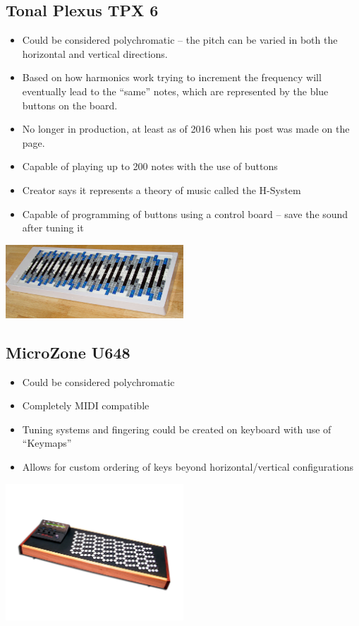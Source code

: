 \documentclass{article}
\begin{document}
\subsection*{Tonal Plexus TPX 6}

\begin{itemize}
	\item Could be considered polychromatic – the pitch can be varied in both the horizontal and vertical directions.
	\item Based on how harmonics work trying to increment the frequency will eventually lead to the “same” notes, which are represented by the blue buttons on the board.
	\item No longer in production, at least as of 2016 when his post was made on the page.
	\item Capable of playing up to 200 notes with the use of buttons
	\item Creator says it represents a theory of music called the H-System
	\item Capable of programming of buttons using a control board – save the sound after tuning it
\end{itemize}

\begin{center}
\includegraphics[width=0.5\textwidth]{mt3.jpg}
\end{center}

\subsection*{MicroZone U648}

\begin{itemize}
	\item Could be considered polychromatic
	\item Completely MIDI compatible
	\item Tuning systems and fingering could be created on keyboard with use of “Keymaps”
	\item Allows for custom ordering of keys beyond horizontal/vertical configurations
\end{itemize}

\begin{center}
\includegraphics[width=0.5\textwidth]{mt4.jpg}
\end{center}
\end{document}
